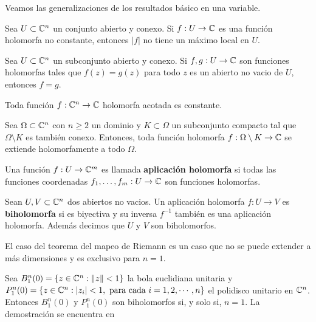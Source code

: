 Veamos las generalizaciones de los resultados básico en una variable.

\begin{theorem}\label{Principiodelmodulomaximo}
	Sea $U\subset \mathbb{C}^n$ un conjunto abierto y conexo. Si $f:U\to\mathbb{C}$ es una función holomorfa no constante, entonces $|f|$ no tiene un máximo local en $U$.
\end{theorem}

\begin{theorem}[de la identidad]\label{identidad}
	Sea $U\subset \mathbb{C}^n$ un subconjunto abierto y conexo. Si $f,g:U\to \mathbb{C}$ son funciones holomorfas tales que $f(z)=g(z)$ para todo $z$ es un abierto no vacio de $U$, entonces $f=g$.
\end{theorem}

\begin{theorem}[de Lioville]
	Toda función $f:\mathbb{C}^n\to\mathbb{C}$ holomorfa acotada es constante.  
\end{theorem}

\begin{theorem}[Hartogs]\label{hartogs}
	Sea $\Omega\subset\mathbb{C}^n$ con $n\geq 2$ un dominio y $K\subset\Omega$ un subconjunto compacto tal que $\Omega\setminus K$ es también conexo. Entonces, toda función holomorfa $f:\Omega\setminus K\to\mathbb{C}$ se extiende holomorfamente a todo $\Omega.$
\end{theorem}


\begin{definition}\label{mapholocn}
	Una función $f:U\to\mathbb{C}^m$ es llamada \textbf{aplicación holomorfa} si todas las funciones coordenadas $f_1,\dots,f_m:U\to\mathbb{C}$ son funciones holomorfas.
\end{definition}


\begin{definition}
	Sean $U,V\subset \mathbb{C}^n$ dos abiertos no vacios. Un aplicación holomorfa $f:U\to V$ es \textbf{biholomorfa} si es biyectiva y su inversa $f^{-1}$ también es una aplicación holomorfa. Además decimos que $U$ y $V$ son biholomorfos. 
\end{definition}

El caso del teorema del mapeo de Riemann es un caso que no se puede extender a más dimensiones y es exclusivo para $n=1$.
\begin{theorem}
	Sea $B_1^n(0)=\{z\in\mathbb{C}^n: \|z\|<1\}$ la bola euclidiana unitaria y $P_1^n(0)=\{z\in\mathbb{C}^n:|z_i|<1,\text{ para cada }i=1,2,\cdots, n\}$ el polidisco unitario en $\mathbb{C}^n$. Entonces $B_1^n(0)$ y $P_1^n(0)$ son biholomorfos si, y solo si, $n=1$. La demostración se encuentra en \parencite[Teo 3.9, Pg. 78]{scheidemann}
\end{theorem}


